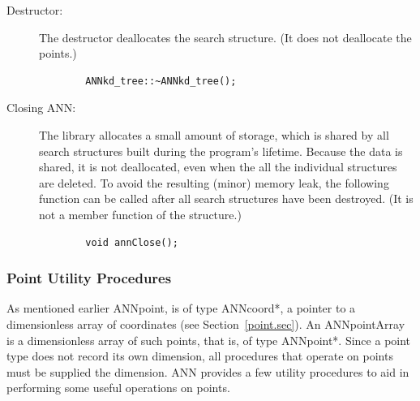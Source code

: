\documentclass[11pt]{article}		%
\newcommand{\ANN}[0]{\textsf{ANN}}
\begin{document}
\begin{description}
\item[Destructor:] The destructor deallocates the search structure.  (It
	does not deallocate the points.)
	{\small \begin{verbatim}
	    ANNkd_tree::~ANNkd_tree();
	\end{verbatim} }

\item[Closing {\ANN}:] The library allocates a small amount of storage,
	which is shared by all search structures built during the program's
	lifetime. Because the data is shared, it is not deallocated, even
	when the all the individual structures are deleted.  To avoid the
	resulting (minor) memory leak, the following function can be called
	after all search structures have been destroyed. (It is not a member
	function of the structure.)
	{\small \begin{verbatim}
	    void annClose();
	\end{verbatim} }
\end{description}

\subsubsection{Point Utility Procedures}\label{util.sec}

As mentioned earlier \textsf{ANNpoint}, is of type \textsf{ANNcoord*}, a
pointer to a dimensionless array of coordinates (see
Section~\ref{point.sec}).  An \textsf{ANNpointArray} is a dimensionless
array of such points, that is, of type \textsf{ANNpoint*}.  Since a
point type does not record its own dimension, all procedures that
operate on points must be supplied the dimension.  {\ANN} provides a few
utility procedures to aid in performing some useful operations on
points.
 
\end{document}
